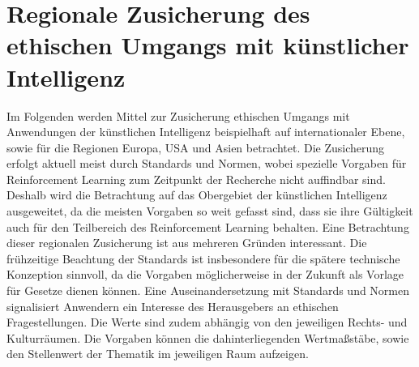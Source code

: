 \chapter{Regionale Zusicherung des ethischen Umgangs mit künstlicher Intelligenz}\label{chap:standards}
Im Folgenden werden Mittel zur Zusicherung ethischen Umgangs mit Anwendungen der künstlichen Intelligenz beispielhaft auf internationaler Ebene, sowie für die Regionen Europa, USA und Asien betrachtet.
Die Zusicherung erfolgt aktuell meist durch Standards und Normen, wobei spezielle Vorgaben für Reinforcement Learning zum Zeitpunkt der Recherche nicht auffindbar sind.
Deshalb wird die Betrachtung auf das Obergebiet der künstlichen Intelligenz ausgeweitet, da die meisten Vorgaben so weit gefasst sind, dass sie ihre Gültigkeit auch für den Teilbereich des Reinforcement Learning behalten.
Eine Betrachtung dieser regionalen Zusicherung ist aus mehreren Gründen interessant.
Die frühzeitige Beachtung der Standards ist insbesondere für die spätere technische Konzeption sinnvoll, da die Vorgaben möglicherweise in der Zukunft als Vorlage für Gesetze dienen können.
Eine Auseinandersetzung mit Standards und Normen signalisiert Anwendern ein Interesse des Herausgebers an ethischen Fragestellungen.
Die Werte sind zudem abhängig von den jeweiligen Rechts- und Kulturräumen.
Die Vorgaben können die dahinterliegenden Wertmaßstäbe, sowie den Stellenwert der Thematik im jeweiligen Raum aufzeigen.




